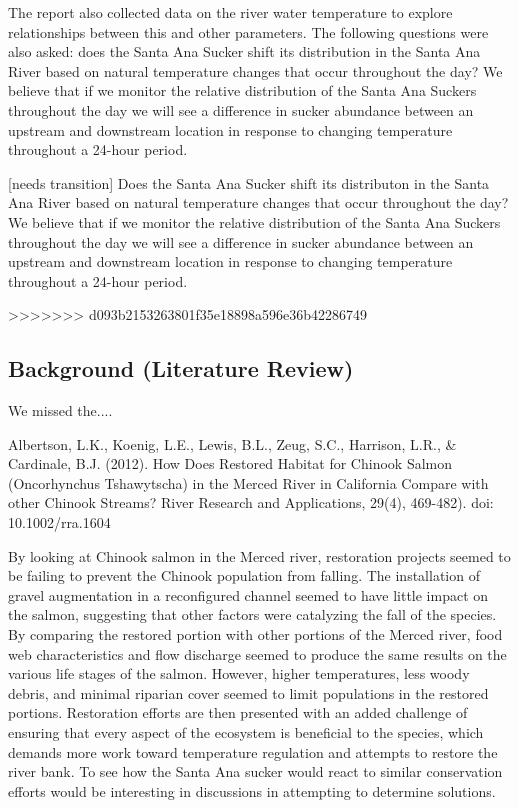 \documentclass{article}\usepackage[]{graphicx}\usepackage[]{color}
\begin{document}
The report also collected data on the river water temperature to explore relationships between this and other parameters. The following questions were also asked: does the Santa Ana Sucker shift its distribution in the Santa Ana River based on natural temperature changes that occur throughout the day? We believe that if we monitor the relative distribution of the Santa Ana Suckers throughout the day we will see a difference in sucker abundance between an upstream and downstream location in response to changing temperature throughout a 24-hour period. 

[needs transition] Does the Santa Ana Sucker shift its distributon in the Santa Ana River based on natural temperature changes that occur throughout the day? We believe that if we monitor the relative distribution of the Santa Ana Suckers throughout the day we will see a difference in sucker abundance between an upstream and downstream location in response to changing temperature throughout a 24-hour period.

>>>>>>> d093b2153263801f35e18898a596e36b42286749
\subsection{Background (Literature Review)}

We missed the....

Albertson, L.K., Koenig, L.E., Lewis, B.L., Zeug, S.C., Harrison, L.R., \& Cardinale, B.J. (2012). How Does Restored Habitat for Chinook Salmon (Oncorhynchus Tshawytscha) in the Merced River in California Compare with other Chinook Streams? River Research and Applications, 29(4), 469-482). doi: 10.1002/rra.1604

By looking at Chinook salmon in the Merced river, restoration projects seemed to be failing to prevent the Chinook population from falling. The installation of gravel augmentation in a reconfigured channel seemed to have little impact on the salmon, suggesting that other factors were catalyzing the fall of the species. By comparing the restored portion with other portions of the Merced river, food web characteristics and flow discharge seemed to produce the same results on the various life stages of the salmon. However, higher temperatures, less woody debris, and minimal riparian cover seemed to limit populations in the restored portions. Restoration efforts are then presented with an added challenge of ensuring that every aspect of the ecosystem is beneficial to the species, which demands more work toward temperature regulation and attempts to restore the river bank. To see how the Santa Ana sucker would react to similar conservation efforts would be interesting in discussions in attempting to determine solutions. 
\end{document}
